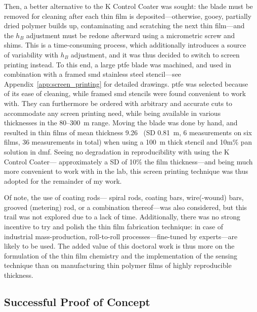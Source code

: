 Then, a better alternative to the K Control Coater was sought: the blade must be removed for cleaning after each thin film is deposited---otherwise, gooey, partially dried polymer builds up, contaminating and scratching the next thin film---and the $h_B$ adjustment must be redone afterward using a micrometric screw and shims. This is a time-consuming process, which additionally introduces a source of variability with $h_B$ adjustment, and it was thus decided to switch to screen printing instead. To this end, a large \gls{ptfe} blade was machined, and used in combination with a framed \gls{smd} stainless steel stencil---see Appendix~\ref{app:screen_printing} for detailed drawings. \gls{ptfe} was selected because of its ease of cleaning, while framed \gls{smd} stencils were found convenient to work with. They can furthermore be ordered with arbitrary and accurate cuts to accommodate any screen printing need, while being available in various thicknesses in the 80--300~\textmu{}m range. Moving the blade was done by hand, and resulted in thin films of mean thickness 9.26~\textmu{} (SD 0.81~\textmu{}m, 6 measurements on six films, 36 measurements in total) when using a 100~\textmu{}m thick stencil and 10m\% \gls{pan} solution in \gls{dmf}. Seeing no degradation in reproducibility with using the K Control Coater---\ie{} approximately a SD of 10\% the film thickness---and being much more convenient to work with in the lab, this screen printing technique was thus adopted for the remainder of my work.

Of note, the use of coating rods---\aka{} spiral rods, coating bars, wire(-wound) bars, grooved (metering) rod, or a combination thereof---was also considered, but this trail was not explored due to a lack of time. Additionally, there was no strong incentive to try and polish the thin film fabrication technique: in case of industrial mass-production, roll-to-roll processes---fine-tuned by experts---are likely to be used. The added value of this doctoral work is thus more on the formulation of the thin film chemistry and the implementation of the sensing technique than on manufacturing thin polymer films of highly reproducible thickness.

\subsection{Successful Proof of Concept}\label{subsect:thin_film:experimental:newcas}

